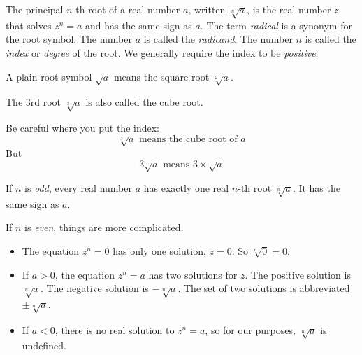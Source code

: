 \label{sec:roots-frac-exp}


The principal $n$-th root of a real number $a$, written
$\sqrt[n]{a}$,
is the real number $z$ that solves
$z^n = a$ and has the same sign as $a$.
The term \emph{radical} is a synonym for the root symbol.
The number $a$ is called the \emph{radicand}.
The number $n$ is called the \emph{index} or \emph{degree} of the root.
We generally require the index to be \emph{positive}.

A plain root symbol $\sqrt{a}$ means the square root $\sqrt[2]{a}$.

The 3rd root $\sqrt[3]{a}$ is also called the cube root.

Be careful where you put the index:
\begin{equation*}
 \sqrt[3]{a} \text{ means the cube root of $a$}
\end{equation*}
But
\begin{equation*}
 3 \sqrt{a} \text{ means } 3 \times \sqrt{a}
\end{equation*}


If $n$ is \emph{odd}, every real number $a$ has exactly one real $n$-th root $\sqrt[n]{a}$.
It has the same sign as $a$.


If $n$ is \emph{even}, things are more complicated.
\begin{itemize}
\item The equation $z^n = 0$ has only one solution, $z = 0$.
 So $\sqrt[n]{0} = 0$.

\item If $a > 0$, the equation $z^n = a$ has two solutions for $z$.
 The positive solution is $\sqrt[n]{a}$.
 The negative solution is $-\sqrt[n]{a}$.
 The set of two solutions is abbreviated $\pm \sqrt[n]{a}$.

\item If $a < 0$, there is no real solution to $z^n = a$, so for our purposes, $\sqrt[n]{a}$ is undefined.
\end{itemize}


